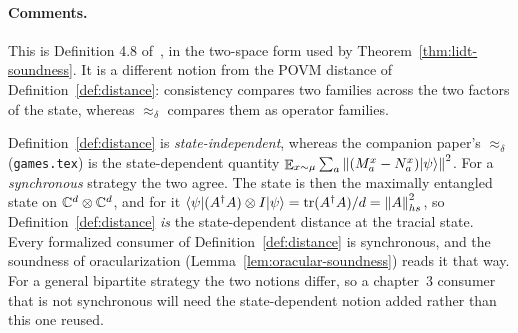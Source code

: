 \paragraph{Comments.} This is Definition 4.8 of~\cite{JNVWY21qld}, in the two-space
form used by Theorem~\ref{thm:lidt-soundness}. It is a different notion from the POVM
distance of Definition~\ref{def:distance}: consistency compares two families across the
two factors of the state, whereas $\approx_\delta$ compares them as operator families.

\begin{remark}
\label{rem:distance-state}
Definition~\ref{def:distance} is \emph{state-independent}, whereas the companion paper's
$\approx_\delta$ (\texttt{games.tex}) is the state-dependent quantity $\mathop{\mathbb{E}}_{x \sim \mu}
\sum_a \left\| {(M^x_a - N^x_a)|\psi\rangle} \right\|^2$. For a \emph{synchronous} strategy the two agree.
The state is then the maximally entangled state on $\mathbb{C}^d \otimes \mathbb{C}^d$, and for it
$\langle\psi| (A^\dagger A) \otimes I |\psi\rangle = \operatorname{tr}(A^\dagger A)/d = \left\| {A} \right\|_{hs}^2$, so
Definition~\ref{def:distance} \emph{is} the state-dependent distance at the tracial state.
Every formalized consumer of Definition~\ref{def:distance} is synchronous, and the soundness
of oracularization (Lemma~\ref{lem:oracular-soundness}) reads it that way. For a general
bipartite strategy the two notions differ, so a chapter~3 consumer that is not synchronous
will need the state-dependent notion added rather than this one reused.
\end{remark}

